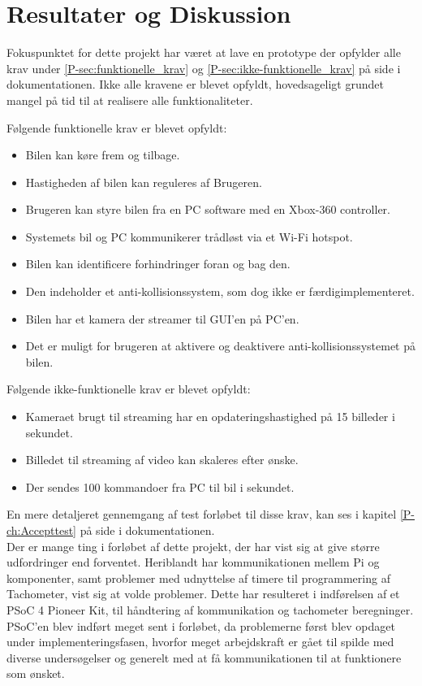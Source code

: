 \chapter{Resultater og Diskussion} \label{ch:Resultater_og_diskussion}

Fokuspunktet for dette projekt har været at lave en prototype der opfylder alle krav under \ref{P-sec:funktionelle_krav}  og \ref{P-sec:ikke-funktionelle_krav}  på side \pageref{P-sec:funktionelle_krav} i dokumentationen. 
Ikke alle kravene er blevet opfyldt, hovedsageligt grundet mangel på tid til at realisere alle funktionaliteter.

Følgende funktionelle krav er blevet opfyldt:
\begin{itemize}
	\item Bilen kan køre frem og tilbage. 
	\item Hastigheden af bilen kan reguleres af Brugeren. 
	\item Brugeren kan styre bilen fra en PC software med en Xbox-360 controller. 			\item Systemets bil og PC kommunikerer trådløst via et Wi-Fi hotspot.
	\item Bilen kan identificere forhindringer foran og bag den. 
	\item Den indeholder et anti-kollisionssystem, som dog ikke er færdigimplementeret. 
	\item Bilen har et kamera der streamer til GUI'en på PC'en. 
	\item Det er muligt for brugeren at aktivere og deaktivere anti-kollisionssystemet på bilen.
\end{itemize}

Følgende ikke-funktionelle krav er blevet opfyldt: 
\begin{itemize}
	\item Kameraet brugt til streaming har en opdateringshastighed på 15 billeder i sekundet. 
	\item Billedet til streaming af video kan skaleres efter ønske. 
	\item Der sendes 100 kommandoer fra PC til bil i sekundet.
\end{itemize}

En mere detaljeret gennemgang af test forløbet til disse krav, kan ses i kapitel \ref{P-ch:Accepttest}  på side \pageref{P-ch:Accepttest} i dokumentationen.\\

Der er mange ting i forløbet af dette projekt, der har vist sig at give større udfordringer end forventet. 
Heriblandt har \IIC kommunikationen mellem Pi og \IIC komponenter, samt problemer med udnyttelse af timere til programmering af Tachometer, vist sig at volde problemer. 
Dette har resulteret i indførelsen af et PSoC 4 Pioneer Kit, til håndtering af \IIC kommunikation og tachometer beregninger. 
PSoC'en blev indført meget sent i forløbet, da problemerne først blev opdaget under implementeringsfasen, hvorfor meget arbejdskraft er gået til spilde med diverse undersøgelser og generelt med at få kommunikationen til at funktionere som ønsket.

